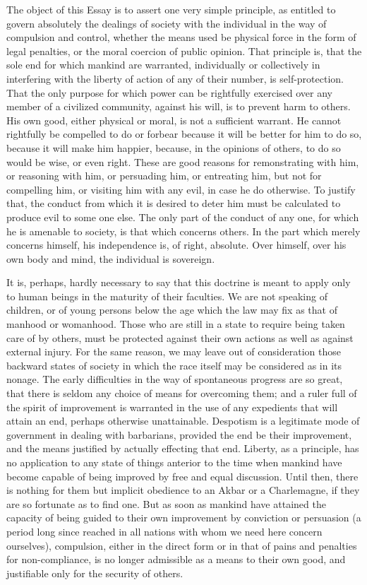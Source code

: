 \documentclass[12pt]{report}
\begin{document}
The object of this Essay is to assert one very simple principle, as entitled to govern absolutely the dealings of society with the individual in the way of compulsion and control, whether the means used be physical force in the form of legal penalties, or the moral coercion of public opinion. That principle is, that the sole end for which mankind are warranted, individually or collectively in interfering with the liberty of action of any of their number, is self-protection. That the only purpose for which power can be rightfully exercised over any member of a civilized community, against his will, is to prevent harm to others. His own good, either physical or moral, is not a sufficient warrant. He cannot rightfully be compelled to do or forbear because it will be better for him to do so, because it will make him happier, because, in the opinions of others, to do so would be wise, or even right. These are good reasons for remonstrating with him, or reasoning with him, or persuading him, or entreating him, but not for compelling him, or visiting him with any evil, in case he do otherwise. To justify that, the conduct from which it is desired to deter him must be calculated to produce evil to some one else. The only part of the conduct of any one, for which he is amenable to society, is that which concerns others. In the part which merely concerns himself, his independence is, of right, absolute. Over himself, over his own body and mind, the individual is sovereign.

It is, perhaps, hardly necessary to say that this doctrine is meant to apply only to human beings in the maturity of their faculties. We are not speaking of children, or of young persons below the age which the law may fix as that of manhood or womanhood. Those who are still in a state to require being taken care of by others, must be protected against their own actions as well as against external injury. For the same reason, we may leave out of consideration those backward states of society in which the race itself may be considered as in its nonage. The early difficulties in the way of spontaneous progress are so great, that there is seldom any choice of means for overcoming them; and a ruler full of the spirit of improvement is warranted in the use of any expedients that will attain an end, perhaps otherwise unattainable. Despotism is a legitimate mode of government in dealing with barbarians, provided the end be their improvement, and the means justified by actually effecting that end. Liberty, as a principle, has no application to any state of things anterior to the time when mankind have become capable of being improved by free and equal discussion. Until then, there is nothing for them but implicit obedience to an Akbar or a Charlemagne, if they are so fortunate as to find one. But as soon as mankind have attained the capacity of being guided to their own improvement by conviction or persuasion (a period long since reached in all nations with whom we need here concern ourselves), compulsion, either in the direct form or in that of pains and penalties for non-compliance, is no longer admissible as a means to their own good, and justifiable only for the security of others.
\end{document}
